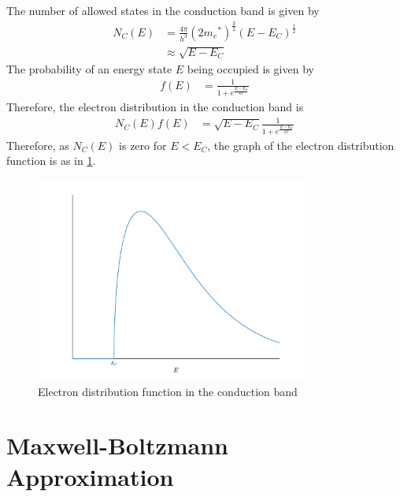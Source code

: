 \documentclass[titlepage, fleqn, a4paper, 12pt, twoside]{article}
\theoremstyle{definition}
\theoremstyle{theorem}
\begin{document}
The number of allowed states in the conduction band is given by
\begin{align*}
	N_C(E) & = \frac{4 \pi}{h^3} \left( 2 {m_e}^* \right)^{\frac{3}{2}} (E - E_C)^{\frac{1}{2}} \\
               & \approx \sqrt{E - E_C}
\end{align*}
The probability of an energy state $E$ being occupied is given by
\begin{align*}
	f(E) & = \frac{1}{1 + e^{\frac{E - E_F}{k T}}}
\end{align*}
Therefore, the electron distribution in the conduction band is
\begin{align*}
	N_C(E) f(E) & = \sqrt{E - E_C} \frac{1}{1 + e^{\frac{E - E_F}{k T}}}
\end{align*}
Therefore, as $N_C(E)$ is zero for $E < E_C$, the graph of the electron distribution function is as in \cref{fig:Electron_distribution_function_in_the_conduction_band}.
\begin{figure}[h]
	\centering
	\includegraphics[width = 0.8\textwidth]{./Plots/electron_distribution_in_conduction_band.pdf}
	\caption{Electron distribution function in the conduction band}
	\label{fig:Electron_distribution_function_in_the_conduction_band}
\end{figure}

\section{Maxwell-Boltzmann Approximation}
\end{document}
